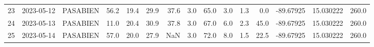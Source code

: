 \documentclass[12pt]{article}
\begin{document}
\begin{center}
\begin{tabular}{lllrrrrrrrrrrrr}
23  & 2023-05-12 &  PASABIEN &    56.2 &  19.4 &   29.9 &  37.6 &        3.0 &     65.0 &  3.0 &         1.3 &         0.0 & -89.67925 &  15.030222 &    260.0 \\
24  & 2023-05-13 &  PASABIEN &    11.0 &  20.4 &   30.9 &  37.8 &        3.0 &     67.0 &  6.0 &         2.3 &        45.0 & -89.67925 &  15.030222 &    260.0 \\
25  & 2023-05-14 &  PASABIEN &    57.0 &  20.0 &   27.9 &   NaN &        3.0 &     72.0 &  8.0 &         1.5 &        22.5 & -89.67925 &  15.030222 &    260.0 \\
\bottomrule
\end{tabular}

        
        \end{center}
        
\end{document}

